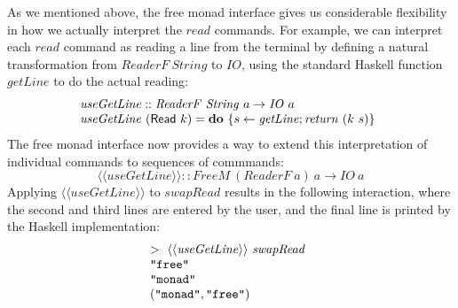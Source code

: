 \documentclass{jfp1}
\newcommand{\fmext}[1]{\langle\langle #1 \rangle\rangle}
\newcommand{\kw}[1]{\textbf{#1}}
\begin{document}
As we mentioned above, the free monad interface gives us considerable
flexibility in how we actually interpret the $\mathit{read}$
commands. For example, we can interpret each $\mathit{read}$ command
as reading a line from the terminal by defining a natural
transformation from $\mathit{ReaderF}~\mathit{String}$ to
$\mathit{IO}$, using the standard Haskell function $\mathit{getLine}$
to do the actual reading:
\begin{displaymath}
  \begin{array}{@{}l}
    \mathit{useGetLine} :: \mathit{ReaderF}~\mathit{String}~a \to \mathit{IO}~a \\
    \mathit{useGetLine}~(\mathsf{Read}~k) = \kw{do}~\{ s \leftarrow \mathit{getLine}; \mathit{return}~(k~s) \}
  \end{array}
\end{displaymath}
The free monad interface now provides a way to extend this
interpretation of individual commands to sequences of commmands:
\begin{displaymath}
  \fmext{\mathit{useGetLine}} :: \mathit{FreeM}~(\mathit{ReaderF}~a)~a \to \mathit{IO}~a
\end{displaymath}
Applying $\fmext{\mathit{useGetLine}}$ to $\mathit{swapRead}$ results
in the following interaction, where the second and third lines are
entered by the user, and the final line is printed by the Haskell
implementation:
\begin{displaymath}
  \begin{array}{@{}l}
    >~\fmext{\mathit{useGetLine}}~\mathit{swapRead} \\
    \texttt{"free"} \\
    \texttt{"monad"} \\
    (\texttt{"monad"}, \texttt{"free"})
  \end{array}
\end{displaymath}
\end{document}
